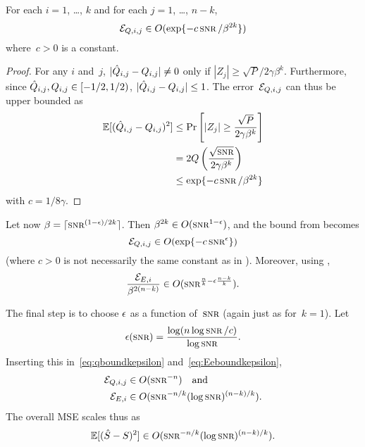 \begin{lemma}
  \label{lem:eqboundk}
  For each $i = 1$, \dots, $k$ and for each $j = 1$, \dots, $n-k$,
  \begin{equation*}
    \Err_{Q,i,j} \in O(\exp\{-c \snr/\beta^{2k} \})
  \end{equation*}
  where~$c > 0$ is a constant.
\end{lemma}

\begin{proof}
  For any $i$ and~$j$, $| \hat{Q}_{i,j} - Q_{i,j}| \ne 0$ only if $|Z_j| \ge
  \sqrt{P} / 2 \gamma \beta^k$. Furthermore, since $\hat{Q}_{i,j}, Q_{i,j} \in
  [-1/2, 1/2)$, $|\hat{Q}_{i,j} - Q_{i,j}| \le 1$. The error~${\mathcal{E}}_{Q,i,j}$ can thus
  be upper bounded as
  \begin{align*}
    \E[(\Qh_{i,j} - Q_{i,j})^2] &\le \Pr\left[|Z_j| \ge \frac{\sqrt{P}}{2 \gamma
    \beta^k} \right] \\
    &= 2 Q\left( \frac{\sqrt{\snr}}{2\gamma\beta^k} \right) \\
    &\le \exp\{-c \snr / \beta^{2k} \}
  \end{align*}
  with $c = 1/8\gamma$.
\end{proof}


Let now $\beta = \lceil \snr^{(1-\e)/2k} \rceil$. Then $\beta^{2k} \in
O(\snr^{1-\e})$, and the bound from  becomes
\begin{equation}
  \label{eq:qboundkepsilon}
  \Err_{Q,i,j} \in O(\exp\{-c \snr^\e\})
\end{equation}
(where $c > 0$ is not necessarily the same constant as in ).
Moreover, using ,
\begin{equation}
  \label{eq:Eeboundkepsilon}
  \frac{\Err_{E,i}}{\beta^{2(n-k)}} \in O(\snr^{\frac{n}{k} - \e
  \frac{n-k}{k}}).
\end{equation}

The final step is to choose $\epsilon$ as a function of~$\snr$ (again just as
for~$k=1$). Let
\begin{equation*}
  \e(\snr) = \frac{\log(n \log\snr / c)}{\log\snr}.
\end{equation*}
Inserting this in~\eqref{eq:qboundkepsilon} and~\eqref{eq:Eeboundkepsilon}, 
\begin{align*}
  \Err_{Q,i,j} &\in O(\snr^{-n}) \quad\text{and} \\
  \Err_{E,i} &\in O(\snr^{-n/k} (\log\snr)^{(n-k)/k}).
\end{align*}
The overall MSE scales thus as
\begin{equation*}
  \mse \in O(\snr^{-n/k} (\log\snr)^{(n-k)/k}).
\end{equation*}


